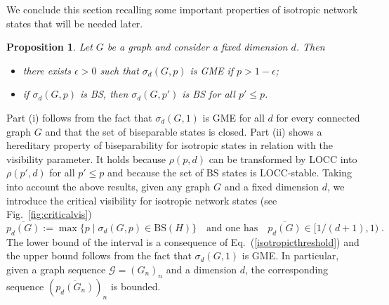 \documentclass[a4paper,onecolumn,accepted=2024-12-14]{quantumarticle}
\newtheorem{proposition}[theorem]{Proposition}
\theoremstyle{plain}
\newcommand{\cG}{{\mathcal G}}         %
\newcommand{\quadtext}[1]{\quad\text{#1}\quad}
\begin{document}
We conclude this section recalling some important properties of isotropic network states that will be needed later.

\begin{proposition}\label{prop:facts}
Let $G$ be a graph and consider a fixed dimension $d$. Then
\begin{itemize}
 \item[(i)] \label{fact1}
 there exists $\epsilon>0$ such that $\sigma_d(G,p)$ is GME if $p>1-\epsilon$;
 \item[(ii)] \label{fact2}
 if $\sigma_d(G,p)$ is BS, then $\sigma_d(G,p')$ is BS for all $p'\leq p$.
\end{itemize}
\end{proposition}

Part (i) follows from the fact that $\sigma_d(G,1)$ is GME for all $d$ for every connected graph $G$ and that the set of biseparable states is closed.
Part (ii) shows a hereditary property of biseparability for isotropic states
in relation with the visibility parameter. It
holds because $\rho(p,d)$ can be transformed by LOCC into $\rho(p',d)$ for all
$p'\leq p$ and because the set of BS states is LOCC-stable. Taking into account the above results, given any graph $G$ and a fixed dimension $d$,
we introduce the critical visibility for isotropic network states (see Fig.~\ref{fig:criticalvis})
\begin{equation}\label{eq:pbar}
\overline{p_d(G)}:=\max\{p\mid \sigma_d(G,p)\in \mathrm{BS}(H)\}
\quadtext{and one has}\overline{p_d(G)}\in[1/(d+1),1)\;.
\end{equation}
The lower bound of the interval is a consequence of Eq.~(\ref{isotropicthreshold}) and the upper bound follows from the fact that $\sigma_d(G,1)$ is GME. In particular, given a graph sequence $\cG=(G_n)_n$ and a dimension $d$, the corresponding sequence
$\left(\overline{p_d(G_n)}\right)_n$ is bounded.
\end{document}
